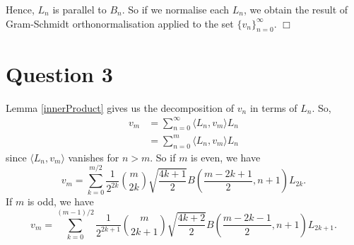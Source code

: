 \documentclass[10pt]{article}
\newenvironment{proof}[1][Proof]{\begin{trivlist}
\item[\hskip \labelsep {\bfseries #1}]}{\end{trivlist}}
\begin{document}
\begin{proof}
            
            Hence, $L_n$ is parallel to $B_n$. So if we normalise
            each $L_n$, we obtain the result of Gram-Schmidt orthonormalisation
            applied to the set $\{v_n\}_{n=0}^\infty$. $\Box$
        \end{proof}
        
        
        
        \section*{Question 3}
        
        Lemma \ref{innerProduct} gives us the decomposition of $v_n$ in terms of $L_n$. So,
        \begin{align*}
            v_m &= \sum_{n=0}^\infty \langle L_n,v_m\rangle L_n\\
            &= \sum_{n=0}^m\langle L_n,v_m\rangle L_n
        \end{align*}
        since $\langle L_n,v_m\rangle$ vanishes for $n>m$.
        So if $m$ is even, we have
        \begin{equation*}
            v_m = \sum_{k=0}^{m/2}\frac{1}{2^{2k}} {m\choose 2k}\sqrt{\frac{4k+1}{2}}B(\frac{m-2k+1}{2},n+1)L_{2k}.
        \end{equation*}
        If $m$ is odd, we have
        \begin{equation*}
            v_m = \sum_{k=0}^{(m-1)/2} \frac{1}{2^{2k+1}}{m\choose 2k+1}\sqrt{\frac{4k+2}{2}}B(\frac{m-2k-1}{2},n+1)L_{2k+1}.
        \end{equation*}
\end{document}
